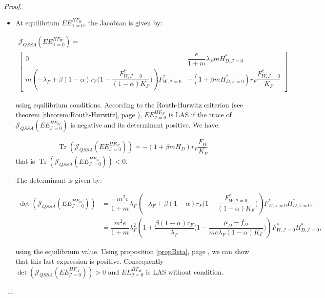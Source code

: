 \documentclass{article}
\newcommand{\lfw}{\lambda_{F}}
\newcommand{\lfw}{\lambda_{F}}
\newcommand{\cI}{\mathcal{I}}
\newcommand{\vdeux}[1]{\textcolor{black}{#1}}
\DeclareMathOperator{\Tr}{Tr}
\theoremstyle{definition}
\theoremstyle{remark}
\begin{document}
\begin{proof}
\begin{itemize}
\item At equilibrium $EE^{HF_W}_{\cI = 0}$, the Jacobian is given by:

\begin{multline*}
\mathcal{J}_{QSSA}(EE^{HF_W}_{\cI = 0}) = \\
\begin{bmatrix}
0 & \dfrac{e}{1+m} \lfw m H^*_{D, \cI = 0} \\
m\left(-\lfw + \beta (1-\alpha) r_F \Big(1- \dfrac{F^*_{W, \cI = 0}}{(1-\alpha)K_F} \Big) \right) F^*_{W, \cI = 0} & -(1+\beta m H^*_{D, \cI = 0}) r_F \dfrac{F^*_{W, \cI = 0}}{K_F} 
\end{bmatrix}
\end{multline*}

using equilibrium conditions. According to \vdeux{the Routh-Hurwitz criterion} (see theorem \ref{theorem:Routh-Hurwitz}, page \pageref{theorem:Routh-Hurwitz} ),  $EE^{HF_W}_{\cI = 0}$ is LAS if the trace of $\mathcal{J}_{QSSA}(EE^{HF_W}_{\cI = 0}) $ is negative and its determinant positive. We have:

\begin{equation*}
\Tr(\mathcal{J}_{QSSA}(EE^{HF_W}_{\cI = 0})) = -(1+\beta m H_D) r_F \dfrac{F_W}{K_F}
\end{equation*}
that is $\Tr(\mathcal{J}_{QSSA}(EE^{HF_W}_{\cI = 0})) < 0$.

The determinant is given by:

\begin{align*}
\det(\mathcal{J}_{QSSA}(EE^{HF_W}_{\cI = 0})) &=  \dfrac{- m^2 e}{1+m} \lfw \left(-\lfw + \beta (1-\alpha) r_F \Big(1- \dfrac{F^*_{W, \cI = 0}}{(1-\alpha)K_F} \Big) \right) F^*_{W, \cI = 0} H^*_{D, \cI = 0}, \\
&= \dfrac{m^2 e}{1+m} \lfw^2 \left(1 + \dfrac{\beta (1-\alpha) r_F}{\lfw} \Big(1- \dfrac{\mu_D - f_D}{me \lfw(1-\alpha)K_F} \Big) \right) F^*_{W, \cI = 0} H^*_{D, \cI = 0},
\end{align*}

using the equilibrium value. Using proposition \ref{propBeta}, page \pageref{propBeta}, we can show that this last expression is positive. Consequently $\det(\mathcal{J}_{QSSA}(EE^{HF_W}_{\cI = 0})) > 0$ and $EE^{HF_W}_{\cI = 0}$ is LAS without condition.
\end{itemize}
\end{proof}
\end{document}
